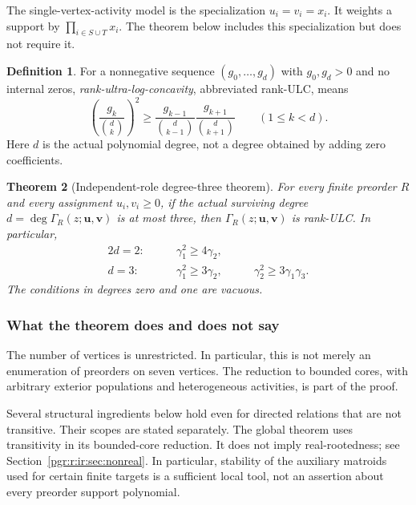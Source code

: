 \documentclass[11pt]{article}
\numberwithin{equation}{section}
\newtheorem{theorem}{Theorem}[section]\newtheorem{lemma}[theorem]{Lemma}\newtheorem{proposition}[theorem]{Proposition}\newtheorem{corollary}[theorem]{Corollary}
\theoremstyle{definition}\newtheorem{definition}[theorem]{Definition}\newtheorem{remark}[theorem]{Remark}
\newcommand{\Ga}{\Gamma}                   %
\begin{document}
The single-vertex-activity model is the specialization $u_i=v_i=x_i$. It weights a support by $\prod_{i\in S\cup T}x_i$. The theorem below includes this specialization but does not require it.

\begin{definition}
For a nonnegative sequence $(g_0,\ldots,g_d)$ with $g_0,g_d>0$ and no internal zeros, \emph{rank-ultra-log-concavity}, abbreviated rank-ULC, means
\begin{equation}\label{pgr:r:ir:eq:ulc}
 \left(\frac{g_k}{\binom dk}\right)^2\ge
 \frac{g_{k-1}}{\binom d{k-1}}\frac{g_{k+1}}{\binom d{k+1}}
 \qquad(1\le k<d).
\end{equation}
Here $d$ is the actual polynomial degree, not a degree obtained by adding zero coefficients.
\end{definition}

\begin{theorem}[Independent-role degree-three theorem]\label{pgr:r:ir:thm:main}
For every finite preorder $R$ and every assignment $u_i,v_i\ge0$, if the actual surviving degree $d=\deg\Ga_R(z;\mathbf u,\mathbf v)$ is at most three, then $\Ga_R(z;\mathbf u,\mathbf v)$ is rank-ULC. In particular,
\begin{alignat}{2}
 d=2:&\qquad \gamma_1^2\ge4\gamma_2,\label{pgr:r:ir:eq:d2}\\
 d=3:&\qquad \gamma_1^2\ge3\gamma_2,
 &\qquad \gamma_2^2\ge3\gamma_1\gamma_3.\label{pgr:r:ir:eq:d3}
\end{alignat}
The conditions in degrees zero and one are vacuous.
\end{theorem}

\subsubsection{What the theorem does and does not say}
The number of vertices is unrestricted. In particular, this is not merely an enumeration of preorders on seven vertices. The reduction to bounded cores, with arbitrary exterior populations and heterogeneous activities, is part of the proof.

Several structural ingredients below hold even for directed relations that are not transitive. Their scopes are stated separately. The global theorem uses transitivity in its bounded-core reduction. It does not imply real-rootedness; see Section~\ref{pgr:r:ir:sec:nonreal}. In particular, stability of the auxiliary matroids used for certain finite targets is a sufficient local tool, not an assertion about every preorder support polynomial.
\end{document}
